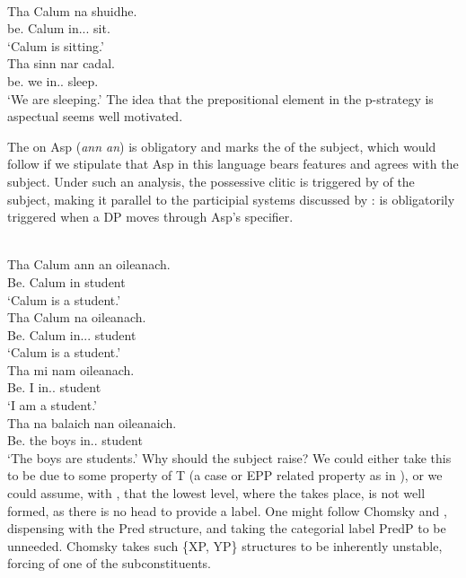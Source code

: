 \documentclass[output=paper]{langsci/langscibook}
\begin{document}
\ea {}\\
\gll Tha Calum na shuidhe. \\
be.\Prs{} Calum in.\Poss.\Tsg.\M{} sit.\Vn{}\\
\glt \enquote*{Calum is sitting.}
\ex {}\\
\gll Tha sinn nar cadal. \\
be.\Prs{} we in.\Poss.\Fpl{} sleep.\Vn{}\\
\glt \enquote*{We are sleeping.}
\z
The idea that the prepositional element in the p-strategy is aspectual seems
well motivated.

The  on Asp (\emph{ann an}) is obligatory and marks the
 of the subject, which would follow if we stipulate that Asp in this
language bears  features and agrees with the subject. Under such
an analysis, the possessive clitic is  triggered by
 of the subject, making it parallel to the 
participial  systems discussed by \citet{kayne93}:
 is obligatorily triggered when a DP moves through Asp's
specifier.

\ea {}\\
    \gll * Tha  Calum  {ann an}  oileanach.\\
        {} Be.\Prs{}  Calum  in  student \\
    \glt {} \enquote*{Calum is a student.}
\ex  {}\\
\gll Tha  Calum na oileanach.\\
Be.\Prs{}  Calum  in.\Poss.\Tsg.\M{}  student \\
\glt \enquote*{Calum is a student.}
\ex  {}\\
\gll Tha  mi  nam  oileanach.\\
Be.\Prs{}  I  in.\Poss.\Fsg{}  student \\
\glt \enquote*{I am a student.}
\ex  {}\\
\gll Tha  na balaich nan  oileanaich.\\
Be.\Prs{}  the boys  in.\Poss.\Tpl{}  student \\
\glt \enquote*{The boys are students.}
\z
Why should the subject raise? We could either take this to be due to some
property of T (a case or \gls{EPP} related property as in
\citealt{roberts-roussou:02}), or we could assume, with \citet{Chomsky2013}, that
the lowest level, where the  takes place, is not well formed, as
there is no head to provide a label. One might follow Chomsky and
\citet{moro:97}, dispensing with the Pred structure, and taking the categorial
label PredP to be unneeded. Chomsky takes such \{XP, YP\} structures to be
inherently unstable, forcing  of one of the
subconstituents.
\end{document}
